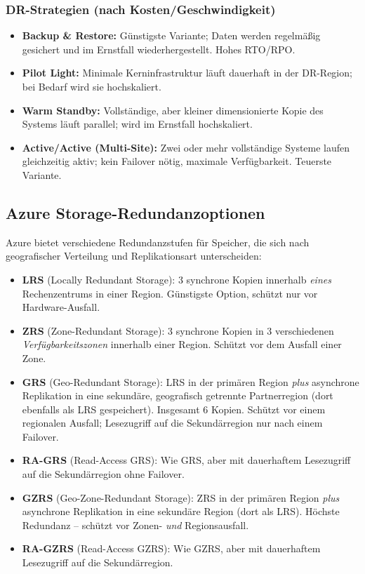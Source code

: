 \subsubsection{DR-Strategien (nach Kosten/Geschwindigkeit)}
\begin{itemize}
    \item \textbf{Backup \& Restore:} Günstigste Variante; Daten werden regelmäßig gesichert und im Ernstfall wiederhergestellt. Hohes RTO/RPO.
    \item \textbf{Pilot Light:} Minimale Kerninfrastruktur läuft dauerhaft in der DR-Region; bei Bedarf wird sie hochskaliert.
    \item \textbf{Warm Standby:} Vollständige, aber kleiner dimensionierte Kopie des Systems läuft parallel; wird im Ernstfall hochskaliert.
    \item \textbf{Active/Active (Multi-Site):} Zwei oder mehr vollständige Systeme laufen gleichzeitig aktiv; kein Failover nötig, maximale Verfügbarkeit. Teuerste Variante.
\end{itemize}

\subsection*{Azure Storage-Redundanzoptionen}
Azure bietet verschiedene Redundanzstufen für Speicher, die sich nach geografischer Verteilung und Replikationsart unterscheiden:

\begin{itemize}
    \item \textbf{LRS} (Locally Redundant Storage): 3 synchrone Kopien innerhalb \emph{eines} Rechenzentrums in einer Region. Günstigste Option, schützt nur vor Hardware-Ausfall.
    \item \textbf{ZRS} (Zone-Redundant Storage): 3 synchrone Kopien in 3 verschiedenen \emph{Verfügbarkeitszonen} innerhalb einer Region. Schützt vor dem Ausfall einer Zone.
    \item \textbf{GRS} (Geo-Redundant Storage): LRS in der primären Region \emph{plus} asynchrone Replikation in eine sekundäre, geografisch getrennte Partnerregion (dort ebenfalls als LRS gespeichert). Insgesamt 6 Kopien. Schützt vor einem regionalen Ausfall; Lesezugriff auf die Sekundärregion nur nach einem Failover.
    \item \textbf{RA-GRS} (Read-Access GRS): Wie GRS, aber mit dauerhaftem Lesezugriff auf die Sekundärregion ohne Failover.
    \item \textbf{GZRS} (Geo-Zone-Redundant Storage): ZRS in der primären Region \emph{plus} asynchrone Replikation in eine sekundäre Region (dort als LRS). Höchste Redundanz -- schützt vor Zonen- \emph{und} Regionsausfall.
    \item \textbf{RA-GZRS} (Read-Access GZRS): Wie GZRS, aber mit dauerhaftem Lesezugriff auf die Sekundärregion.
\end{itemize}

